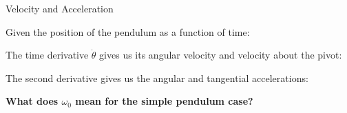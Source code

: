 \documentclass[12pt,compress,aspectratio=169]{beamer}
\begin{document}
\begin{frame}{Velocity and Acceleration}

  Given the position of the pendulum as a function of time:
  

  \vspace{-.05in}The time derivative $\dot\theta$ gives us its angular
  velocity and velocity about the pivot:


  The second derivative gives us the angular and tangential accelerations:


  \textbf{What does $\omega_0$ mean for the simple pendulum case?}
\end{frame}
\end{document}
